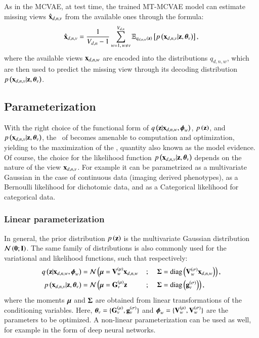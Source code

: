 As in the MCVAE, at test time, the trained MT-MCVAE model can estimate missing views $\hat{\mathbf{x}}_{d,n,v}$ from the available ones through the formula:
\begin{equation}\label{eq:reconstruction}
\begin{aligned}
\hat{\mathbf{x}}_{d,n,v} = \frac{1}{V_{d, n}-1} \sum_{w=1, \,w\neq v}^{V_{d, n}} \operatorname{\mathbb{E}}_{q_{d,n,w}(\mathbf{z})}\left[p\left(\mathbf{x}_{d,n,v}|\mathbf{z}, \boldsymbol{\theta}_v\right)\right],
\end{aligned}
\end{equation}
where the available views $\mathbf{x}_{d,n,w}$ are encoded into the distributions $q_{d,n,w}$, which are then used to predict the missing view through its decoding distribution $p\left(\mathbf{x}_{d,n,v}|\mathbf{z}, \boldsymbol{\theta}_v\right)$.

\subsection{Parameterization}
\label{ssec:parameterization}

With the right choice of the functional form of $q\left(\mathbf{z}|\mathbf{x}_{d,n,w}, \boldsymbol{\phi}_w\right)$, $p\left(\mathbf{z}\right)$, and $p\left(\mathbf{x}_{d,n,v}|\mathbf{z}, \boldsymbol{\theta}_v\right)$, the \rhs\ of  becomes amenable to computation and optimization, yielding to the maximization of the \lhs, quantity also known as the model evidence.
Of course, the choice for the likelihood function $p\left(\mathbf{x}_{d,n,v}|\mathbf{z}, \boldsymbol{\theta}_v\right)$ depends on the nature of the view $\mathbf{x}_{d,n,v}$.
For example it can be parametrized as a multivariate Gaussian in the case of continuous data (\ie imaging derived phenotypes), as a Bernoulli likelihood for dichotomic data, and as a Categorical likelihood for categorical data.

\subsubsection{Linear parameterization}
In general, the prior distribution $p\left(\mathbf{z}\right)$ is the  multivariate Gaussian distribution $\mathcal{N}\left(\mathbf{0};\mathbf{I}\right)$.
The same family of distributions is also commonly used for the variational and likelihood functions, such that respectively:
\begin{alignat}{4}
\label{eq:encoder}
q\left(\mathbf{z}|\mathbf{x}_{d,n,w}, \boldsymbol{\phi}_w\right)  &= \mathcal{N} \left( \boldsymbol{\mu} = \mathbf{V}_w^{(\mu)} \mathbf{x}_{d,n,w} \right. &&{}; &&\left.\boldsymbol{\Sigma} = \operatorname{diag}\left(\mathbf{V}_w^{(\sigma)} \mathbf{x}_{d,n,w}\right) \right), \\
\label{eq:decoder}
p\left(\mathbf{x}_{d,n,v}|\mathbf{z},\boldsymbol{\theta}_v\right) &= \mathcal{N} \left( \boldsymbol{\mu} = \mathbf{G}_v^{(\mu)} \mathbf{z} \right. &&{} ; &&\left.\boldsymbol{\Sigma} = \operatorname{diag}\left(\mathbf{g}_v^{(\sigma)}\right) \right),
\end{alignat}
where the moments $\boldsymbol{\mu}$ and $\boldsymbol{\Sigma}$ are obtained from linear transformations of the conditioning variables.
Here, $\boldsymbol{\theta}_v = \{\mathbf{G}_v^{(\mu)}, \mathbf{g}_v^{(\sigma)}\}$ and $\boldsymbol{\phi}_w=\{\mathbf{V}_w^{(\mu)}, \mathbf{V}_w^{(\sigma)}\}$ are the parameters to be optimized.
A non-linear parameterization can be used as well, for example in the form of deep neural networks.


